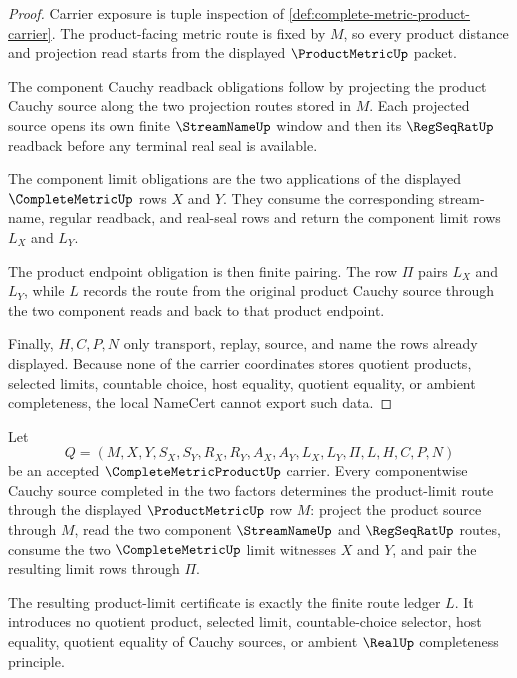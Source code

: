\begin{proof}
Carrier exposure is tuple inspection of
\autoref{def:complete-metric-product-carrier}. The product-facing metric
route is fixed by $M$, so every product distance and projection read starts
from the displayed $\ProductMetricUp$ packet.

The component Cauchy readback obligations follow by projecting the product
Cauchy source along the two projection routes stored in $M$. Each projected
source opens its own finite $\StreamNameUp$ window and then its
$\RegSeqRatUp$ readback before any terminal real seal is available.

The component limit obligations are the two applications of the displayed
$\CompleteMetricUp$ rows $X$ and $Y$. They consume the corresponding
stream-name, regular readback, and real-seal rows and return the component
limit rows $L_X$ and $L_Y$.

The product endpoint obligation is then finite pairing. The row $\Pi$ pairs
$L_X$ and $L_Y$, while $L$ records the route from the original product Cauchy
source through the two component reads and back to that product endpoint.

Finally, $H,C,P,N$ only transport, replay, source, and name the rows already
displayed. Because none of the carrier coordinates stores quotient products,
selected limits, countable choice, host equality, quotient equality, or
ambient completeness, the local NameCert cannot export such data.
\end{proof}

\begin{theorem}
\label{thm:complete-metric-product-limit-pairing}
Let
$$
Q=(M,X,Y,S_X,S_Y,R_X,R_Y,A_X,A_Y,L_X,L_Y,\Pi,L,H,C,P,N)
$$
be an accepted $\CompleteMetricProductUp$ carrier. Every componentwise Cauchy
source completed in the two factors determines the product-limit route through
the displayed $\ProductMetricUp$ row $M$: project the product source through
$M$, read the two component $\StreamNameUp$ and $\RegSeqRatUp$ routes, consume
the two $\CompleteMetricUp$ limit witnesses $X$ and $Y$, and pair the resulting
limit rows through $\Pi$.

The resulting product-limit certificate is exactly the finite route ledger
$L$. It introduces no quotient product, selected limit, countable-choice
selector, host equality, quotient equality of Cauchy sources, or ambient
$\RealUp$ completeness principle.
\end{theorem}

